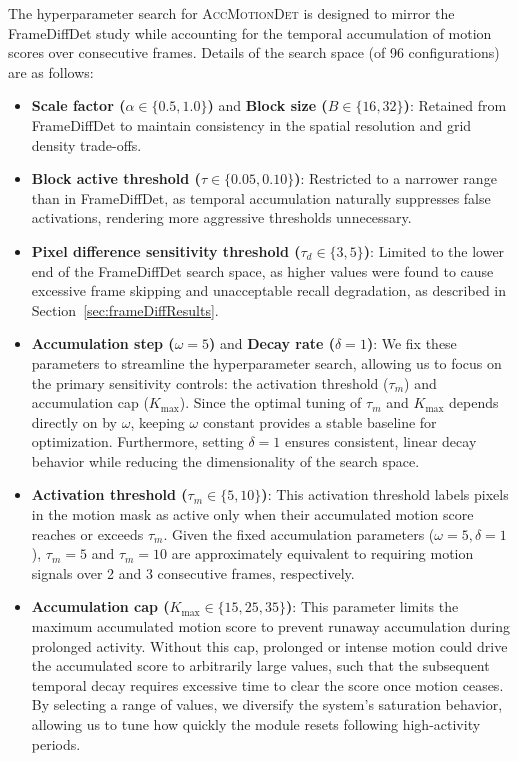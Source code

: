\documentclass[
  10pt,
]{article}
\begin{document}
The hyperparameter search for \textsc{AccMotionDet} is designed to
mirror the FrameDiffDet study while accounting for the temporal
accumulation of motion scores over consecutive frames. Details of the
search space (of 96 configurations) are as follows:

\begin{itemize}
\item
  \textbf{Scale factor (\(\alpha \in \{0.5, 1.0\}\))} and \textbf{Block
  size (\(B \in \{16,
  32\}\))}: Retained from FrameDiffDet to maintain consistency in the
  spatial resolution and grid density trade-offs.
\item
  \textbf{Block active threshold (\(\tau \in \{0.05, 0.10\}\))}:
  Restricted to a narrower range than in FrameDiffDet, as temporal
  accumulation naturally suppresses false activations, rendering more
  aggressive thresholds unnecessary.
\item
  \textbf{Pixel difference sensitivity threshold
  (\(\tau_d \in \{3, 5\}\))}: Limited to the lower end of the
  FrameDiffDet search space, as higher values were found to cause
  excessive frame skipping and unacceptable recall degradation, as
  described in Section~\ref{sec:frameDiffResults}.
\item
  \textbf{Accumulation step (\(\omega=5\))} and \textbf{Decay rate
  (\(\delta=1\))}: We fix these parameters to streamline the
  hyperparameter search, allowing us to focus on the primary sensitivity
  controls: the activation threshold (\(\tau_m\)) and accumulation cap
  (\(K_{\max}\)). Since the optimal tuning of \(\tau_m\) and
  \(K_{\max}\) depends directly on by \(\omega\), keeping \(\omega\)
  constant provides a stable baseline for optimization. Furthermore,
  setting \(\delta=1\) ensures consistent, linear decay behavior while
  reducing the dimensionality of the search space.
\item
  \textbf{Activation threshold (\(\tau_m \in \{5, 10\}\))}: This
  activation threshold labels pixels in the motion mask as active only
  when their accumulated motion score reaches or exceeds \(\tau_m\).
  Given the fixed accumulation parameters (\(\omega=5, \delta=1\)),
  \(\tau_m=5\) and \(\tau_m=10\) are approximately equivalent to
  requiring motion signals over 2 and 3 consecutive frames,
  respectively.
\item
  \textbf{Accumulation cap (\(K_{\max} \in \{15, 25, 35\}\))}: This
  parameter limits the maximum accumulated motion score to prevent
  runaway accumulation during prolonged activity. Without this cap,
  prolonged or intense motion could drive the accumulated score to
  arbitrarily large values, such that the subsequent temporal decay
  requires excessive time to clear the score once motion ceases. By
  selecting a range of values, we diversify the system's saturation
  behavior, allowing us to tune how quickly the module resets following
  high-activity periods.
\end{itemize}
\end{document}
